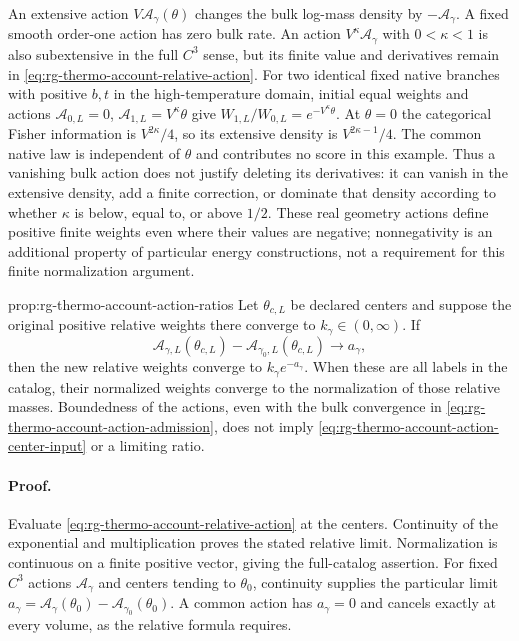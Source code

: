 An extensive action $V\mathscr A_\gamma(\theta)$ changes the bulk
log-mass density by $-\mathscr A_\gamma$. A fixed smooth order-one action
has zero bulk rate. An action $V^\kappa\mathscr A_\gamma$ with
$0<\kappa<1$ is also subextensive in the full $C^3$ sense, but its
finite value and derivatives remain in
\cref{eq:rg-thermo-account-relative-action}. For two identical fixed
native branches with positive $b,t$ in the high-temperature domain,
initial equal weights and actions
$\mathscr A_{0,L}=0$, $\mathscr A_{1,L}=V^\kappa\theta$ give
$W_{1,L}/W_{0,L}=e^{-V^\kappa\theta}$. At $\theta=0$ the
categorical Fisher information is $V^{2\kappa}/4$, so its extensive
density is $V^{2\kappa-1}/4$. The common native law is independent of
$\theta$ and contributes no score in this example. Thus a vanishing
bulk action does not justify deleting its derivatives: it can vanish
in the extensive density, add a finite correction, or dominate that
density according to whether $\kappa$ is below, equal to, or above
$1/2$. These real geometry actions define positive finite weights even
where their values are negative; nonnegativity is an additional property
of particular energy constructions, not a requirement for this finite
normalization argument.

{prop:rg-thermo-account-action-ratios}
Let $\theta_{c,L}$ be declared centers and suppose the original positive
relative weights there converge to $k_\gamma\in(0,\infty)$.
If
\begin{equation}
 \mathscr A_{\gamma,L}(\theta_{c,L})-
 \mathscr A_{\gamma_0,L}(\theta_{c,L})\longrightarrow a_\gamma,
 \label{eq:rg-thermo-account-action-center-input}
\end{equation}
then the new relative weights converge to $k_\gamma e^{-a_\gamma}$.
When these are all labels in the catalog, their normalized weights
converge to the normalization of those relative masses. Boundedness of
the actions, even with the bulk convergence in
\cref{eq:rg-thermo-account-action-admission}, does not imply
\cref{eq:rg-thermo-account-action-center-input} or a limiting ratio.\thermoestablishedstatus


\paragraph{Proof.}
Evaluate \cref{eq:rg-thermo-account-relative-action} at the centers.
Continuity of the exponential and multiplication proves the stated
relative limit. Normalization is continuous on a finite positive vector,
giving the full-catalog assertion. For fixed $C^3$ actions
$\mathscr A_\gamma$ and centers tending to $\theta_0$, continuity
supplies the particular limit
$a_\gamma=\mathscr A_\gamma(\theta_0)-
\mathscr A_{\gamma_0}(\theta_0)$. A common action has $a_\gamma=0$
and cancels exactly at every volume, as the relative formula requires.

